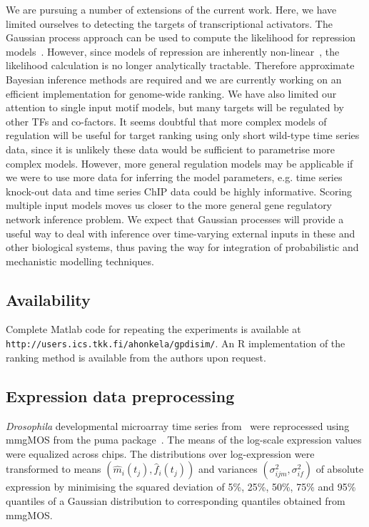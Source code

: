 \documentclass{pnastwo}
\begin{document}
\begin{article}
We are pursuing a number of extensions of the current work. Here, we
have limited ourselves to detecting the targets of transcriptional activators. The
Gaussian process approach can be used to compute the likelihood for
repression models~\cite{Gao2008}. However, since models of repression
are inherently non-linear~\cite{Khanin2006}, the likelihood calculation is no longer analytically
tractable. Therefore approximate Bayesian inference methods are
required and we are currently working on an efficient implementation
for genome-wide ranking. We have also limited our attention
to single input motif models, but many targets will be regulated by other TFs and
co-factors. It seems doubtful that more complex models of regulation
will be useful for target ranking using only short wild-type time
series data, since it is unlikely these data would be sufficient to parametrise more complex models. However,
more general regulation models may be applicable if we were to use more data for
inferring the model parameters, e.g. time series knock-out data and time series
ChIP data could be highly informative. Scoring multiple input
models moves us closer to the more general gene regulatory network inference
problem. We expect that Gaussian processes will provide a useful way
to deal with inference over time-varying external inputs in these and other
biological systems, thus paving the way for integration of
probabilistic and mechanistic modelling techniques.

\subsection{Availability}
Complete Matlab code for repeating the experiments is available at
\texttt{http://users.ics.tkk.fi/ahonkela/gpdisim/}.
An R implementation of
the ranking method is available from the authors upon request.

\begin{materials}
  \section{Expression data preprocessing} {\it Drosophila} developmental
  microarray time series from~\cite{Tomancak2002} were reprocessed
  using mmgMOS from the puma package~\cite{Pearson2009}.  The means of
  the log-scale expression values were equalized across chips.  The
  distributions over log-expression were transformed to means
  $\left(\hat{m}_i(t_j), \hat{f}_i(t_j)\right)$ and variances $\left(\sigma_{ijm}^2,
  \sigma_{if}^2 \right)$ of absolute expression by minimising the squared
  deviation of 5\%, 25\%, 50\%, 75\% and 95\% quantiles of a Gaussian
  distribution to corresponding quantiles obtained from mmgMOS.


\end{materials}
\end{article}
\end{document}

